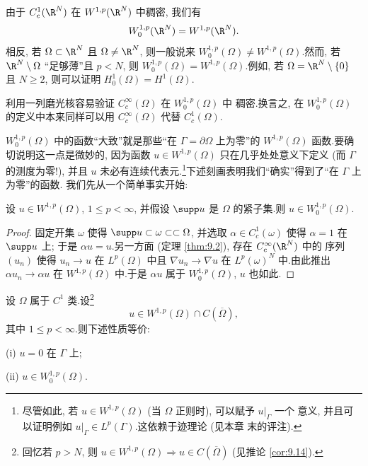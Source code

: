 \begin{starremark}
\label{rem:9.17}
由于 $C_c^1(\R^N)$ 在 $W^{1,p}(\R^N)$ 中稠密, 我们有
\begin{equation*}
W_0^{1,p}(\R^N)=W^{1,p}(\R^N).
\end{equation*}
相反, 若 $\Omega\subset\R^N$ 且 $\Omega\ne\R^N$, 则一般说来
$W_0^{1,p}(\Omega)\ne W^{1,p}(\Omega)$.然而, 若 $\R^N\setminus\Omega$
``足够薄''且 $p<N$, 则 $W_0^{1,p}(\Omega)=W^{1,p}(\Omega)$.例如, 若
$\Omega=\R^N\setminus\{0\}$ 且 $N\ge2$, 则可以证明
$H_0^1(\Omega)=H^1(\Omega)$.
\end{starremark}

\begin{remark}
\label{rem:9.18}
利用一列磨光核容易验证 $C_c^\infty(\Omega)$ 在 $W_0^{1,p}(\Omega)$ 中
稠密.换言之, 在 $W_0^{1,p}(\Omega)$ 的定义中本来同样可以用
$C_c^\infty(\Omega)$ 代替 $C_c^1(\Omega)$.

$W_0^{1,p}(\Omega)$ 中的函数``大致''就是那些``在 $\Gamma=\partial\Omega$
上为零''的 $W^{1,p}(\Omega)$ 函数.要确切说明这一点是微妙的, 因为函数
$u\in W^{1,p}(\Omega)$ 只在几乎处处意义下定义 (而 $\Gamma$ 的测度为零!),
并且 $u$ 未必有连续代表元.\footnote{尽管如此, 若
$u\in W^{1,p}(\Omega)$ (当 $\Omega$ 正则时), 可以赋予 $u|_\Gamma$ 一个
意义, 并且可以证明例如 $u|_\Gamma\in L^p(\Gamma)$.这依赖于迹理论 (见本章
末的评注).}下述刻画表明我们``确实''得到了``在 $\Gamma$ 上为零''的函数.
我们先从一个简单事实开始:
\end{remark}

\begin{lemma}
\label{lem:9.5}
设 $u\in W^{1,p}(\Omega)$, $1\le p<\infty$, 并假设 $\supp u$ 是 $\Omega$
的紧子集.则 $u\in W_0^{1,p}(\Omega)$.
\end{lemma}

\begin{proof}
固定开集 $\omega$ 使得 $\supp u\subset\omega\subset\subset\Omega$, 并选取
$\alpha\in C_c^1(\omega)$ 使得 $\alpha=1$ 在 $\supp u$ 上; 于是
$\alpha u=u$.另一方面 (定理  \ref{thm:9.2}), 存在 $C_c^\infty(\R^N)$ 中的
序列 $(u_n)$ 使得 $u_n\to u$ 在 $L^p(\Omega)$ 中且
$\nabla u_n\to\nabla u$ 在 $L^p(\omega)^N$ 中.由此推出
$\alpha u_n\to\alpha u$ 在 $W^{1,p}(\Omega)$ 中.于是
$\alpha u$ 属于 $W_0^{1,p}(\Omega)$, $u$ 也如此.
\end{proof}

\begin{theorem}
\label{thm:9.17}
设 $\Omega$ 属于 $C^1$ 类.设\footnote{回忆若 $p>N$, 则
$u\in W^{1,p}(\Omega)\Rightarrow u\in C(\overline\Omega)$ (见推论
 \ref{cor:9.14}).}
\begin{equation*}
u\in W^{1,p}(\Omega)\cap C(\overline\Omega),
\end{equation*}
其中 $1\le p<\infty$.则下述性质等价:

\noindent (i) $u=0$ 在 $\Gamma$ 上;

\noindent (ii) $u\in W_0^{1,p}(\Omega)$.
\end{theorem}

